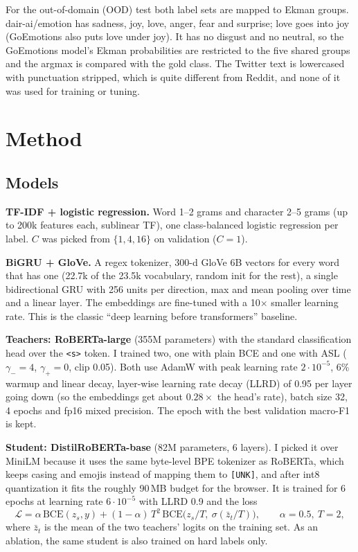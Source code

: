 \documentclass[11pt,a4paper]{article}
\begin{document}
For the out-of-domain (OOD) test both label sets are mapped to Ekman groups. dair-ai/emotion has sadness, joy,
love, anger, fear and surprise; love goes into joy (GoEmotions also puts love under joy). It has no disgust and
no neutral, so the GoEmotions model's Ekman probabilities are restricted to the five shared groups and the
argmax is compared with the gold class. The Twitter text is lowercased with punctuation stripped, which is quite
different from Reddit, and none of it was used for training or tuning.

\section{Method}

\subsection{Models}

\textbf{TF-IDF + logistic regression.} Word 1--2 grams and character 2--5 grams (up to 200k features each,
sublinear TF), one class-balanced logistic regression per label. $C$ was picked from $\{1, 4, 16\}$ on
validation ($C=1$).

\textbf{BiGRU + GloVe.} A regex tokenizer, 300-d GloVe 6B vectors \cite{glove} for every word that has one
(22.7k of the 23.5k vocabulary, random init for the rest), a single bidirectional GRU with 256 units per
direction, max and mean pooling over time and a linear layer. The embeddings are fine-tuned with a 10$\times$
smaller learning rate. This is the classic ``deep learning before transformers'' baseline.

\textbf{Teachers: RoBERTa-large} \cite{roberta} (355M parameters) with the standard classification head over
the \texttt{<s>} token. I trained two, one with plain BCE and one with ASL ($\gamma_-=4$, $\gamma_+=0$,
clip 0.05). Both use AdamW with peak learning rate $2\cdot10^{-5}$, 6\% warmup and linear decay, layer-wise
learning rate decay (LLRD) of 0.95 per layer going down (so the embeddings get about $0.28\times$ the head's
rate), batch size 32, 4 epochs and fp16 mixed precision. The epoch with the best validation macro-F1 is kept.

\textbf{Student: DistilRoBERTa-base} \cite{distilbert} (82M parameters, 6 layers). I picked it over MiniLM
because it uses the same byte-level BPE tokenizer as RoBERTa, which keeps casing and emojis instead of
mapping them to \texttt{[UNK]}, and after int8 quantization it fits the roughly 90\,MB budget for the browser.
It is trained for 6 epochs at learning rate $6\cdot10^{-5}$ with LLRD 0.9 and the loss
\[
  \mathcal{L} = \alpha\,\mathrm{BCE}(z_s, y) + (1-\alpha)\,T^2\,\mathrm{BCE}\big(z_s/T,\ \sigma(\bar z_t/T)\big),
  \qquad \alpha = 0.5,\ T = 2,
\]
where $\bar z_t$ is the mean of the two teachers' logits on the training set. As an ablation, the same student
is also trained on hard labels only.
\end{document}
